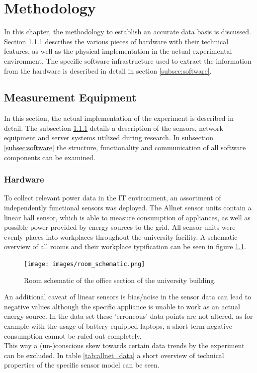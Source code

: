 \chapter{Methodology}\label{chap:methods}
In this chapter, the methodology to establish an accurate data basis is discussed.  Section \ref{subsec:hardware} describes the various pieces of hardware with their technical features, as well as the physical implementation in the actual experimental environment. The specific software infrastructure used to extract the information from the hardware is described in detail in section \ref{subsec:software}.


\section{Measurement Equipment}
In this section, the actual implementation of the experiment is described in detail. The subsection \ref{subsec:hardware} details a description of the sensors, network equipment and server systems utilized during research. In subsection \ref{subsec:software} the structure, functionality and communication of all software components can be examined.
\subsection{Hardware}\label{subsec:hardware}
To collect relevant power data in the IT environment, an assortment of independently functional sensors was deployed.
The Allnet sensor units contain a linear hall sensor, which is able to measure consumption of appliances, as well as possible power provided by energy sources to the grid. All sensor units were evenly places into workplaces throughout the university facility. A schematic overview of all rooms and their workplace typification can be seen in figure \ref{fig:schema}.
\begin{figure}[h]
	\centering
	\texttt{[image: images/room\_schematic.png]}
	\caption{Room schematic of the office section of the university building.}
	\label{fig:schema}
\end{figure} 
An additional caveat of linear sensors is bias/noise in the sensor data can lead to negative values although the specific appliance is unable to work as an actual energy source. In the data set these 'erroneous' data points are not altered, as for example with the usage of battery equipped laptops, a short term negative consumption cannot be ruled out completely.\\
This way a (un-)conscious skew towards certain data trends by the experiment can be excluded. In table \ref{tab:allnet_data} a short overview of technical properties of the specific sensor model can be seen.

